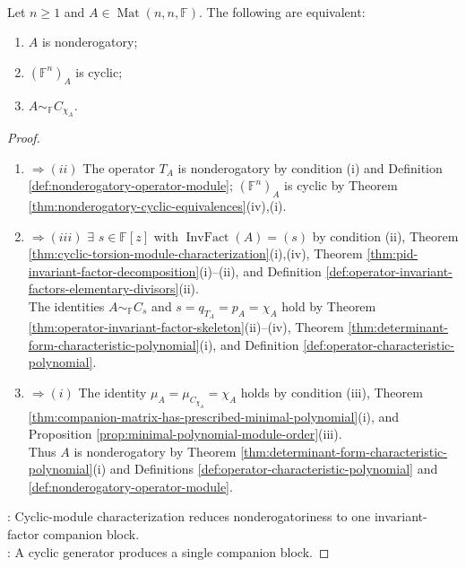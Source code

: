 \begin{corollary} \label{cor:nonderogatory-iff-companion-similar} \\
Let $n\geq1$ and $A\in\operatorname{Mat}(n,n,\mathbb{F})$. The following are equivalent:
\begin{enumerate}[label=(\roman*)]
\setlength{\itemsep}{0pt}
\item $A$ is nonderogatory;
\item $(\mathbb{F}^n)_A$ is cyclic;
\item $A\sim_{\mathbb{F}}C_{\chi_A}$.
\end{enumerate}
\begin{proof}
\begin{enumerate}[label=(\roman*)]
\setlength{\itemsep}{0pt}
\item[$(i)$] $\Rightarrow (ii)$ The operator $T_A$ is nonderogatory by condition (i) and Definition \ref{def:nonderogatory-operator-module}; $(\mathbb{F}^n)_A$ is cyclic by Theorem \ref{thm:nonderogatory-cyclic-equivalences}(iv),(i).
\item[$(ii)$] $\Rightarrow (iii)$ $\exists$ $s\in\mathbb{F}[z]$ with $\operatorname{InvFact}(A)=(s)$ by condition (ii), Theorem \ref{thm:cyclic-torsion-module-characterization}(i),(iv), Theorem \ref{thm:pid-invariant-factor-decomposition}(i)--(ii), and Definition \ref{def:operator-invariant-factors-elementary-divisors}(ii).\\
The identities $A\sim_{\mathbb{F}}C_s$ and $s=q_{T_A}=p_A=\chi_A$ hold by Theorem \ref{thm:operator-invariant-factor-skeleton}(ii)--(iv), Theorem \ref{thm:determinant-form-characteristic-polynomial}(i), and Definition \ref{def:operator-characteristic-polynomial}.
\item[$(iii)$] $\Rightarrow (i)$ The identity $\mu_A=\mu_{C_{\chi_A}}=\chi_A$ holds by condition (iii), Theorem \ref{thm:companion-matrix-has-prescribed-minimal-polynomial}(i), and Proposition \ref{prop:minimal-polynomial-module-order}(iii).\\
Thus $A$ is nonderogatory by Theorem \ref{thm:determinant-form-characteristic-polynomial}(i) and Definitions \ref{def:operator-characteristic-polynomial} and \ref{def:nonderogatory-operator-module}.
\end{enumerate}
: Cyclic-module characterization reduces nonderogatoriness to one invariant-factor companion block.\\
: A cyclic generator produces a single companion block.
\end{proof}
\end{corollary}

